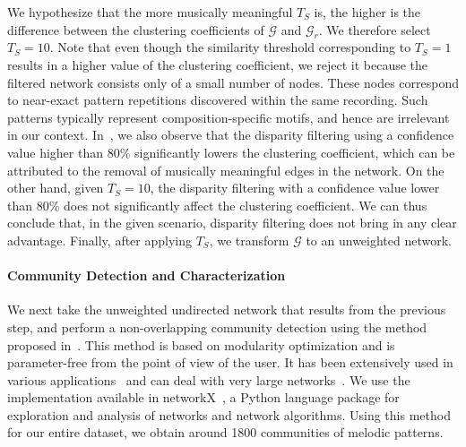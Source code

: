 We hypothesize that the more musically meaningful $T_S$ is, the higher is the difference between the clustering coefficients of $\mathcal{G}$ and $\mathcal{G}_r$. We therefore select $T_S=10$. Note that even though the similarity threshold corresponding to $T_S=1$ results in a higher value of the clustering coefficient, we reject it because the filtered network consists only of a small number of nodes. These nodes correspond to near-exact pattern repetitions discovered within the same recording. Such patterns typically represent composition-specific motifs, and hence are irrelevant in our context. In~, we also observe that the disparity filtering using a confidence value higher than 80\% significantly lowers the clustering coefficient, which can be attributed to the removal of musically meaningful edges in the network. On the other hand, given $T_S=10$, the disparity filtering with a confidence value lower than 80\% does not significantly affect the clustering coefficient. We can thus conclude that, in the given scenario, disparity filtering does not bring in any clear advantage. Finally, after applying $T_S$, we transform $\mathcal{G}$ to an unweighted network. 


\paragraph{Community Detection and Characterization}
\label{sec:patterns_characterization_community_detection}

We next take the unweighted undirected network that results from the previous step, and perform a non-overlapping community detection using the method proposed in~\cite{blondel2008fast}. This method is based on modularity optimization and is parameter-free from the point of view of the user. It has been extensively used in various applications~\citep{fortunato2010community} and can deal with very large networks~\citep{blondel2008fast}. We use the implementation available in networkX~\citep{hagberg-2008-exploring}, a Python language package for exploration and analysis of networks and network algorithms. Using this method for our entire dataset, we obtain around 1800 communities of melodic patterns. 


